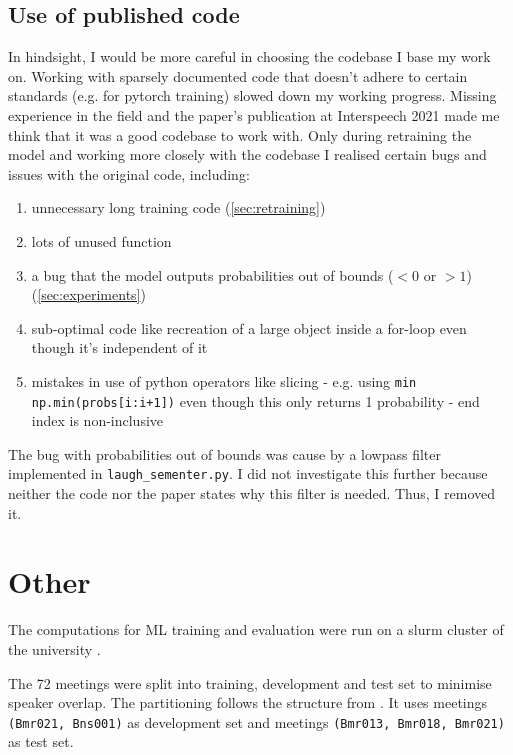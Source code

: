 \documentclass[bsc,frontabs,parskip,deptreport]{infthesis}
\begin{document}
\section{Use of published code}
In hindsight, I would be more careful in choosing the codebase I base my work on.
Working with sparsely documented code that doesn't adhere to certain standards (e.g. for pytorch training) slowed down my working progress. 
Missing experience in the field and the paper's publication at Interspeech 2021 made me think that it was a good codebase to work with.
Only during retraining the model and working more closely with the codebase I realised certain bugs and issues with the original code, including:
\begin{enumerate}
    \item unnecessary long training code (\autoref{sec:retraining})
    \item lots of unused function
    \item a bug that the model outputs probabilities out of bounds ($<0$ or $>1$) (\autoref{sec:experiments})
    \item sub-optimal code like recreation of a large object inside a for-loop even though it's independent of it
    \item mistakes in use of python operators like slicing - e.g. using \texttt{min} \texttt{np.min(probs[i:i+1])} even though this only returns 1 probability - end index is non-inclusive
\end{enumerate}

The bug with probabilities out of bounds was cause by a lowpass filter implemented in \verb|laugh_sementer.py|. I did not investigate this further because neither the code nor the paper states why this filter is needed. Thus, I removed it.

\chapter{Other}

The computations for ML training and evaluation were run on a slurm cluster of the university \citep{yoo2003slurm, tange2011gnu}.

The 72 meetings were split into training, development and test set to minimise speaker overlap. The partitioning follows the structure from \citeauthor{renals2014neural}. It uses meetings \texttt{(Bmr021, Bns001)} as development set and meetings \texttt{(Bmr013, Bmr018, Bmr021)} as test set.



\end{document}
